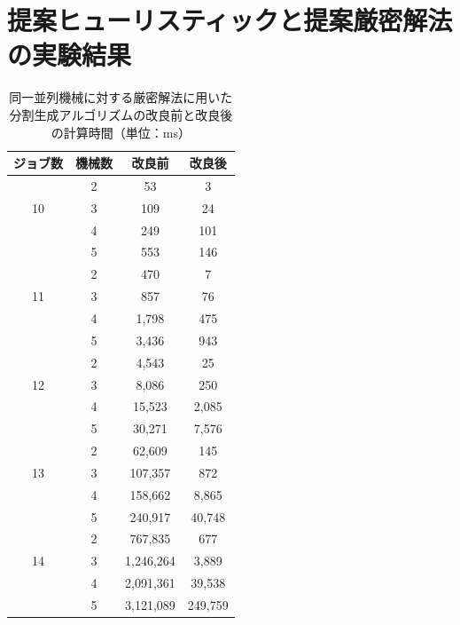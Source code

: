 \documentclass[12pt]{optlab-bachelor}
\begin{document}
\appendix
\chapter{提案ヒューリスティックと提案厳密解法の実験結果}\label{c_7}

\begin{table}[htb]
  \begin{center}
    \begin{tabular}{|c|c|c|c|} \hline
      ジョブ数 & 機械数 & 改良前 & 改良後 \\ \hline \hline
      & 2 & 53 & 3  \\ \cline{2-4}
      10 & 3 & 109 & 24  \\ \cline{2-4}
      & 4 & 249 & 101  \\ \cline{2-4}
      & 5 & 553 & 146  \\ \hline \hline
      & 2 & 470 & 7  \\ \cline{2-4}
      11 & 3 & 857 & 76 \\ \cline{2-4}
      & 4 & 1,798 & 475  \\ \cline{2-4}
      & 5 & 3,436 & 943  \\ \hline \hline
      & 2 & 4,543 & 25  \\ \cline{2-4}
      12 & 3 & 8,086 & 250  \\ \cline{2-4}
      & 4 & 15,523 & 2,085 \\ \cline{2-4}
      & 5 & 30,271 & 7,576   \\ \hline \hline
      & 2 & 62,609 & 145 \\ \cline{2-4}
      13 & 3 & 107,357 & 872 \\ \cline{2-4}
      & 4 & 158,662 & 8,865 \\ \cline{2-4}
      & 5 & 240,917 & 40,748 \\ \hline \hline
      & 2 & 767,835 & 677 \\ \cline{2-4}
      14 & 3 & 1,246,264 & 3,889 \\ \cline{2-4}
      & 4 & 2,091,361 & 39,538 \\ \cline{2-4}
      & 5 & 3,121,089 & 249,759  \\ \hline \hline
    \end{tabular}
    \caption{同一並列機械に対する厳密解法に用いた分割生成アルゴリズムの改良前と改良後の計算時間（単位：ms）}
    \label{A1}
  \end{center}
\end{table}
\end{document}
